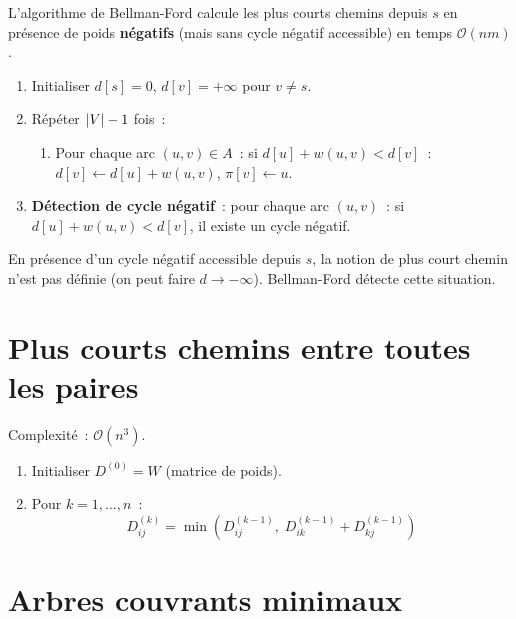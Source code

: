 \begin{theoreme}
L'algorithme de Bellman-Ford calcule les plus courts chemins depuis $s$ en
pr\'esence de poids \textbf{n\'egatifs} (mais sans cycle n\'egatif accessible)
en temps $\mathcal{O}(nm)$.
\end{theoreme}

\begin{algorithme}[title=\textbf{Algorithme de Bellman-Ford}]
\begin{enumerate}
  \item Initialiser $d[s] = 0$, $d[v] = +\infty$ pour $v \ne s$.
  \item R\'ep\'eter $\left| V \right| - 1$ fois~:
    \begin{enumerate}
      \item Pour chaque arc $(u,v) \in A$~: si $d[u] + w(u,v) < d[v]$~:
            $d[v] \leftarrow d[u] + w(u,v)$, $\pi[v] \leftarrow u$.
    \end{enumerate}
  \item \textbf{D\'etection de cycle n\'egatif}~: pour chaque arc $(u,v)$~:
        si $d[u] + w(u,v) < d[v]$, il existe un cycle n\'egatif.
\end{enumerate}
\end{algorithme}

\begin{attention}[title=\textbf{Cycles n\'egatifs}]
En pr\'esence d'un cycle n\'egatif accessible depuis $s$, la notion de plus
court chemin n'est pas d\'efinie (on peut faire $d \to -\infty$).
Bellman-Ford d\'etecte cette situation.
\end{attention}

\section{Plus courts chemins entre toutes les paires}

\begin{algorithme}[title=\textbf{Algorithme de Floyd-Warshall}]
Complexit\'e~: $\mathcal{O}(n^3)$.
\begin{enumerate}
  \item Initialiser $D^{(0)} = W$ (matrice de poids).
  \item Pour $k = 1, \ldots, n$~:
    \[
      D^{(k)}_{ij} = \min\left(D^{(k-1)}_{ij},\;
        D^{(k-1)}_{ik} + D^{(k-1)}_{kj}\right)
    \]
\end{enumerate}
\end{algorithme}

\section{Arbres couvrants minimaux}

